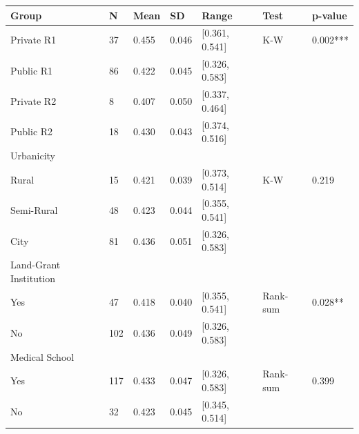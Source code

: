 \begin{tabular}{lllllll}
\toprule
Group & N & Mean & SD & Range & Test & p-value \\
\midrule
Private R1 & 37 & 0.455 & 0.046 & [0.361, 0.541] & K-W & 0.002*** \\
Public R1 & 86 & 0.422 & 0.045 & [0.326, 0.583] &  &  \\
Private R2 & 8 & 0.407 & 0.050 & [0.337, 0.464] &  &  \\
Public R2 & 18 & 0.430 & 0.043 & [0.374, 0.516] &  &  \\
Urbanicity &  &  &  &  &  &  \\
Rural & 15 & 0.421 & 0.039 & [0.373, 0.514] & K-W & 0.219 \\
Semi-Rural & 48 & 0.423 & 0.044 & [0.355, 0.541] &  &  \\
City & 81 & 0.436 & 0.051 & [0.326, 0.583] &  &  \\
Land-Grant Institution &  &  &  &  &  &  \\
Yes & 47 & 0.418 & 0.040 & [0.355, 0.541] & Rank-sum & 0.028** \\
No & 102 & 0.436 & 0.049 & [0.326, 0.583] &  &  \\
Medical School &  &  &  &  &  &  \\
Yes & 117 & 0.433 & 0.047 & [0.326, 0.583] & Rank-sum & 0.399 \\
No & 32 & 0.423 & 0.045 & [0.345, 0.514] &  &  \\
\bottomrule
\end{tabular}
